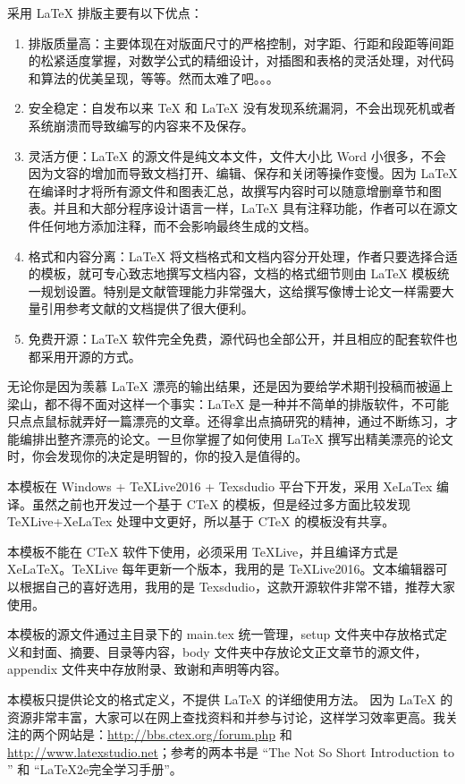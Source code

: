 采用 \LaTeX{} 排版主要有以下优点：
\begin{enumerate}
	\item 排版质量高：主要体现在对版面尺寸的严格控制，对字距、行距和段距等间距的松紧适度掌握，对数学公式的精细设计，对插图和表格的灵活处理，对代码和算法的优美呈现，等等。然而太难了吧。。。
	\item 安全稳定：自发布以来 \TeX{} 和 \LaTeX{} 没有发现系统漏洞，不会出现死机或者系统崩溃而导致编写的内容来不及保存。
	\item 灵活方便：\LaTeX{} 的源文件是纯文本文件，文件大小比 Word 小很多，不会因为文容的增加而导致文档打开、编辑、保存和关闭等操作变慢。因为 \LaTeX{} 在编译时才将所有源文件和图表汇总，故撰写内容时可以随意增删章节和图表。并且和大部分程序设计语言一样，\LaTeX{} 具有注释功能，作者可以在源文件任何地方添加注释，而不会影响最终生成的文档。
	\item 格式和内容分离：\LaTeX{} 将文档格式和文档内容分开处理，作者只要选择合适的模板，就可专心致志地撰写文档内容，文档的格式细节则由 \LaTeX{} 模板统一规划设置。特别是文献管理能力非常强大，这给撰写像博士论文一样需要大量引用参考文献的文档提供了很大便利。
	\item 免费开源：\LaTeX{} 软件完全免费，源代码也全部公开，并且相应的配套软件也都采用开源的方式。
\end{enumerate}

无论你是因为羡慕 \LaTeX{} 漂亮的输出结果，还是因为要给学术期刊投稿而被逼上梁山，都不得不面对这样一个事实：\LaTeX{} 是一种并不简单的排版软件，不可能只点点鼠标就弄好一篇漂亮的文章。还得拿出点搞研究的精神，通过不断练习，才能编排出整齐漂亮的论文。一旦你掌握了如何使用 \LaTeX{} 撰写出精美漂亮的论文时，你会发现你的决定是明智的，你的投入是值得的。


本模板在 Windows + TeXLive2016 + Texsdudio 平台下开发，采用 XeLaTex 编译。虽然之前也开发过一个基于 CTeX 的模板，但是经过多方面比较发现 TeXLive+XeLaTex 处理中文更好，所以基于 CTeX 的模板没有共享。

{\color{red}本模板不能在 CTeX 软件下使用，必须采用 TeXLive，并且编译方式是 XeLaTeX。TeXLive 每年更新一个版本，我用的是 TeXLive2016。文本编辑器可以根据自己的喜好选用，我用的是 Texsdudio，这款开源软件非常不错，推荐大家使用。}

本模板的源文件通过主目录下的 main.tex 统一管理，setup 文件夹中存放格式定义和封面、摘要、目录等内容，body 文件夹中存放论文正文章节的源文件，appendix 文件夹中存放附录、致谢和声明等内容。

本模板只提供论文的格式定义，不提供 \LaTeX{} 的详细使用方法。%
因为 \LaTeX{} 的资源非常丰富，大家可以在网上查找资料和并参与讨论，这样学习效率更高。我关注的两个网站是：\url{http://bbs.ctex.org/forum.php} 和 \url{http://www.latexstudio.net}；参考的两本书是 ``The Not So Short Introduction to \LaTeXe'' 和 ``LaTeX2e完全学习手册''。

